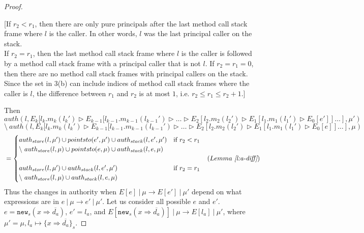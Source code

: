 \documentclass{llncs}
\newcommand{\keywadj}[1]{\mathtt{#1}}
\newcommand{\intuition}[1]{#1}
\begin{document}
\begin{proof}
\begin{enumerate}
\end{enumerate}
\intuition{[If $r_2 < r_1$, then there are only pure principals after the last method call stack frame where $l$ is the caller. In other words, $l$ was the last principal caller on the stack.\\
If $r_2 = r_1$, then the last method call stack frame where $l$ is the caller is followed by a method call stack frame with a principal caller that is not $l$. If $r_2 = r_1 = 0$, then there are no method call stack frames with principal callers on the stack.\\
Since the set in 3(b) can include indices of method call stack frames where the caller is $l$, the difference between $r_1$ and $r_2$ is at most $1$, i.e. $r_2 \le r_1 \le r_2 + 1$.]}

Then
\noindent$auth(l, E_k[l_k.m_k(l_k') \rhd E_{k-1}[l_{k-1}.m_{k-1}(l_{k-1}') \rhd \dots \rhd E_2[l_2.m_2(l_2') \rhd E_1[l_1.m_1(l_1') \rhd E_0[e']] \dots ], \mu')$\\
$\setminus~auth(l, E_k[l_k.m_k(l_k') \rhd E_{k-1}[l_{k-1}.m_{k-1}(l_{k-1}') \rhd \dots \rhd E_2[l_2.m_2(l_2') \rhd E_1[l_1.m_1(l_1') \rhd E_0[e]] \dots ], \mu)$
\vspace{-7pt}
\begin{align*}
&=
\begin{cases}
    auth_{store}(l, \mu') \cup pointsto(e', \mu') \cup auth_{stack}(l, e', \mu') & \text{if } r_2 < r_1\\
    \setminus~auth_{store}(l, \mu) \cup pointsto(e, \mu) \cup auth_{stack}(l, e, \mu)\\\\
    auth_{store}(l, \mu') \cup auth_{stack}(l, e', \mu')& \text{if } r_2 = r_1\\
    \setminus~auth_{store}(l, \mu) \cup auth_{stack}(l, e, \mu)
\end{cases} & (Lemma~\textit{\ref{l:a-diff}})
\end{align*}
Thus the changes in authority when $E[e]~|~\mu \longrightarrow E[e']~|~\mu'$ depend on what expressions are in $e~|~\mu \longrightarrow e'~|~\mu'$. Let us consider all possible $e$ and $e'$.\\


\noindent{}
\mbox{$e = \keywadj{new}_s(x \Rightarrow \overline{d_a})$}, \mbox{$e' = l_a$}, and \mbox{$E[\keywadj{new}_s(x \Rightarrow \overline{d_a})]~|~\mu \longrightarrow E[l_a]~|~\mu'$}, where\\
\mbox{$\mu' = \mu, l_a \mapsto \{ x \Rightarrow \overline{d_a} \}_s$}.


\end{proof}
\end{document}
